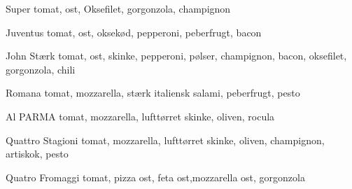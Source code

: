 \begin{enumdescription}
\item[Super] tomat, ost, Oksefilet, gorgonzola, champignon
\item[Juventus] tomat, ost, oksekød, pepperoni, peberfrugt, bacon
\item[John Stærk] tomat, ost, skinke, pepperoni, pølser, champignon,
  bacon, oksefilet, gorgonzola, chili
\item[Romana] tomat, mozzarella, stærk italiensk salami, peberfrugt,
  pesto
\item[Al PARMA] tomat, mozzarella, lufttørret skinke, oliven, rocula
\item[Quattro Stagioni] tomat, mozzarella, lufttørret skinke, oliven,
  champignon, artiskok, pesto
\item[Quatro Fromaggi] tomat, pizza ost, feta ost,mozzarella ost,
  gorgonzola
\end{enumdescription}




